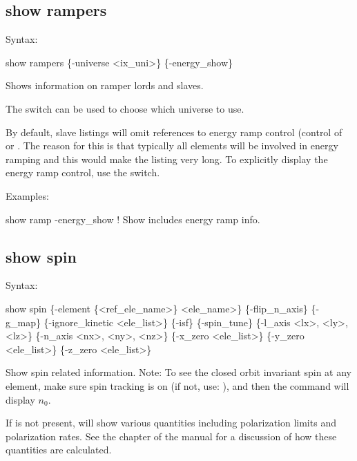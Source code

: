 {{{{{{{{{{%

\subsection{show rampers}
\label{s:show.ramp}

Syntax:
\begin{example}
  show rampers \{-universe <ix_uni>\} \{-energy_show\}
\end{example}

Shows information on ramper lords and slaves.

The  switch can be used to choose which universe to use.

By default, slave listings will omit references to energy ramp control (control of  or .
The reason for this is that typically all elements will be involved in energy ramping and this would make
the listing very long. To explicitly display the energy ramp control, use the  switch.

Examples:
\begin{example}
  show ramp -energy_show  ! Show includes energy ramp info.
\end{example}


\subsection{show spin}
\label{s:show.spin}

Syntax:
\begin{example}
  show spin \{-element \{<ref_ele_name>\} <ele_name>\} \{-flip_n_axis\} \{-g_map\}
                  \{-ignore_kinetic <ele_list>\} \{-isf\} \{-spin_tune\}
                  \{-l_axis <lx>, <ly>, <lz>\} \{-n_axis <nx>, <ny>, <nz>\} 
                  \{-x_zero <ele_list>\} \{-y_zero <ele_list>\} \{-z_zero <ele_list>\}
\end{example}

Show spin related information.  Note: To see the closed orbit invariant spin at any element, make
sure spin tracking is on (if not, use: ), and then the
 command will display $n_0$.

If  is not present,  will show various quantities including polarization
limits and polarization rates. See the  chapter of the \bmad manual for a
discussion of how these quantities are calculated.

}}}}}}}}}}
